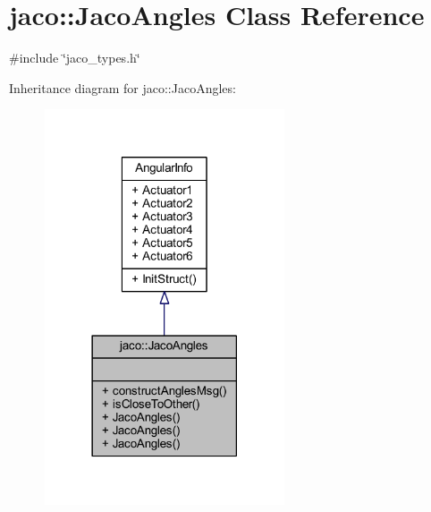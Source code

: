 \hypertarget{classjaco_1_1JacoAngles}{}\section{jaco\+:\+:Jaco\+Angles Class Reference}
\label{classjaco_1_1JacoAngles}


{\ttfamily \#include \char`\"{}jaco\+\_\+types.\+h\char`\"{}}



Inheritance diagram for jaco\+:\+:Jaco\+Angles\+:
\nopagebreak
\begin{figure}[H]
\begin{center}
\leavevmode
\includegraphics[width=201pt]{d9/d99/classjaco_1_1JacoAngles__inherit__graph}
\end{center}
\end{figure}


